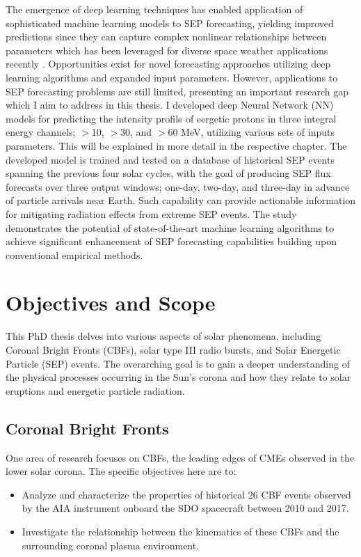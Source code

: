 The emergence of deep learning techniques has enabled application of sophisticated machine learning models to SEP forecasting, yielding improved predictions since they can capture complex nonlinear relationships between parameters which has been leveraged for diverse space weather applications recently \citep{florios_2018, camporeale_2019}. Opportunities exist for novel forecasting approaches utilizing deep learning algorithms and expanded input parameters. However, applications to SEP forecasting problems are still limited, presenting an important research gap which I aim to address in this thesis. I developed deep Neural Network (NN) models for predicting the intensity profile of eergetic protons in three integral energy channels; $>$10, $>$30, and $>$60 MeV, utilizing various sets of inputs parameters. This will be explained in more detail in the respective chapter. The developed model is trained and tested on a database of historical SEP events spanning the previous four solar cycles, with the goal of producing SEP flux forecasts over three output windows; one-day, two-day, and three-day in advance of particle arrivals near Earth. Such capability can provide actionable information for mitigating radiation effects from extreme SEP events. The study demonstrates the potential of state-of-the-art machine learning algorithms to achieve significant enhancement of SEP forecasting capabilities building upon conventional empirical methods.

\section{Objectives and Scope}
This PhD thesis delves into various aspects of solar phenomena, including Coronal Bright Fronts (CBFs), solar type III radio bursts, and Solar Energetic Particle (SEP) events. The overarching goal is to gain a deeper understanding of the physical processes occurring in the Sun's corona and how they relate to solar eruptions and energetic particle radiation.

\subsection*{Coronal Bright Fronts}
One area of research focuses on CBFs, the leading edges of CMEs observed in the lower solar corona. The specific objectives here are to:

\begin{itemize}
	\item Analyze and characterize the properties of historical 26 CBF events observed by the AIA instrument onboard the SDO spacecraft between 2010 and 2017.
	\item Investigate the relationship between the kinematics of these CBFs and the surrounding coronal plasma environment.
\end{itemize}

